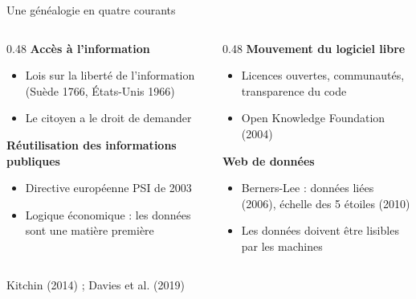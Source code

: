 \documentclass[11pt,aspectratio=169]{beamer}
\newcommand{\refc}[1]{\textcolor{gris}{\footnotesize #1}}
\begin{document}
\begin{frame}{Une généalogie en quatre courants}
  \begin{columns}[T]
    \begin{column}{0.48\textwidth}
      \textbf{\color{bleu}Accès à l'information}
      \begin{itemize}
        \item Lois sur la liberté de l'information (Suède 1766, États-Unis 1966)
        \item Le citoyen a le droit de demander
      \end{itemize}
      \vspace{0.5em}
      \textbf{\color{bleu}Réutilisation des informations publiques}
      \begin{itemize}
        \item Directive européenne PSI de 2003
        \item Logique économique : les données sont une matière première
      \end{itemize}
    \end{column}
    \begin{column}{0.48\textwidth}
      \textbf{\color{bleu}Mouvement du logiciel libre}
      \begin{itemize}
        \item Licences ouvertes, communautés, transparence du code
        \item Open Knowledge Foundation (2004)
      \end{itemize}
      \vspace{0.5em}
      \textbf{\color{bleu}Web de données}
      \begin{itemize}
        \item Berners-Lee : données liées (2006), échelle des 5 étoiles (2010)
        \item Les données doivent être lisibles par les machines
      \end{itemize}
    \end{column}
  \end{columns}
  \vfill
  \refc{Kitchin (2014) ; Davies et al. (2019)}
\end{frame}
\end{document}
